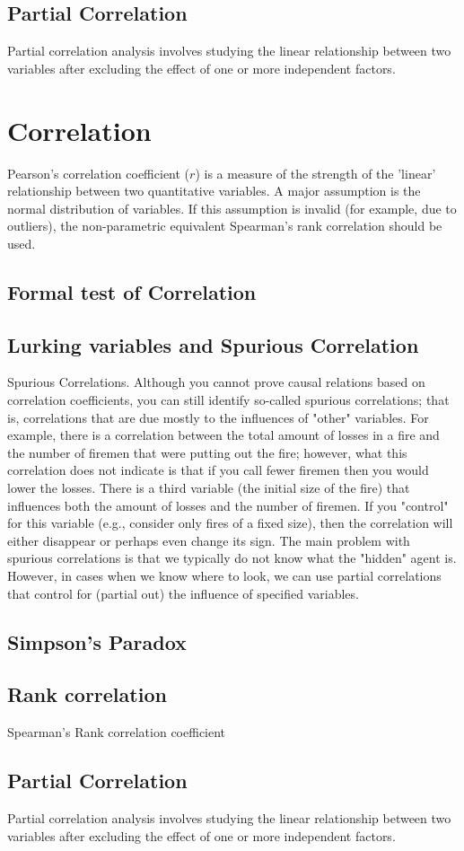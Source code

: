 \subsection{Partial Correlation}
Partial correlation analysis involves studying the linear relationship between two variables after excluding the effect of one or more independent factors.


\newpage

\section{Correlation}

Pearson's correlation coefficient ($r$) is a measure of the strength of the 'linear' relationship between two quantitative variables. A major assumption is the normal distribution of variables. If this assumption is invalid (for example, due to outliers), the non-parametric equivalent Spearman's rank correlation should be used.

\subsection{Formal test of Correlation}
\subsection{Lurking variables and Spurious Correlation}
Spurious Correlations. Although you cannot prove causal relations based on correlation coefficients, you can still identify so-called spurious correlations; that is, correlations that are due mostly to the influences of "other" variables. For example, there is a correlation between the total amount of losses in a fire and the number of firemen that were putting out the fire; however, what this correlation does not indicate is that if you call fewer firemen then you would lower the losses. There is a third variable (the initial size of the fire) that influences both the amount of losses and the number of firemen. If you "control" for this variable (e.g., consider only fires of a fixed size), then the correlation will either disappear or perhaps even change its sign. The main problem with spurious correlations is that we typically do not know what the "hidden" agent is. However, in cases when we know where to look, we can use partial correlations that control for (partial out) the influence of specified variables.



\subsection{Simpson's Paradox}
\subsection{Rank correlation}
Spearman's Rank correlation coefficient


\subsection{Partial Correlation}
Partial correlation analysis involves studying the linear relationship between two variables after excluding the effect of one or more independent factors.


